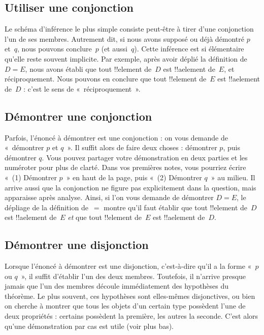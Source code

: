 \documentclass[../../../include/open-logic-section]{subfiles}
\begin{document}
\subsection{Utiliser une conjonction}

Le schéma d'inférence le plus simple consiste peut-être à tirer
d'une conjonction l'un de ses membres. Autrement dit, si nous avons
supposé ou déjà démontré $p$ et~$q$, nous pouvons conclure~$p$
(et aussi~$q$). Cette inférence est si élémentaire qu'elle reste
souvent implicite. Par exemple, après avoir déplié la définition
de $D = E$, nous avons établi que tout !!{element} de~$D$ est
!!a{element} de~$E$, et réciproquement. Nous pouvons en conclure
que tout !!{element} de~$E$ est !!a{element} de~$D$ : c'est le
sens de «~réciproquement~».

\subsection{Démontrer une conjonction}

Parfois, l'énoncé à démontrer est une conjonction : on vous demande
de «~démontrer $p$ et $q$~». Il suffit alors de faire deux choses :
démontrer $p$, puis démontrer $q$. Vous pouvez partager votre
démonstration en deux parties et les numéroter pour plus de clarté.
Dans vos premières notes, vous pourriez écrire «~(1) Démontrer
$p$~» en haut de la page, puis «~(2) Démontrer $q$~» au milieu.
Il arrive aussi que la conjonction ne figure pas explicitement
dans la question, mais apparaisse après analyse. Ainsi, si l'on
vous demande de démontrer $D = E$, le dépliage de la définition
de~$=$ montre qu'il faut établir que tout !!{element} de~$D$
est !!a{element} de~$E$ \emph{et} que tout !!{element} de~$E$
est !!a{element} de~$D$.

\subsection{Démontrer une disjonction}

Lorsque l'énoncé à démontrer est une disjonction, c'est-à-dire
qu'il a la forme «~$p$ ou $q$~», il suffit d'établir l'un des
deux membres. Toutefois, il n'arrive presque jamais que l'un
des membres découle immédiatement des hypothèses du théorème.
Le plus souvent, ces hypothèses sont elles-mêmes disjonctives,
ou bien on cherche à montrer que tous les objets d'un certain
type possèdent l'une de deux propriétés : certains possèdent
la première, les autres la seconde. C'est alors qu'une
démonstration par cas est utile (voir plus bas).
\end{document}
